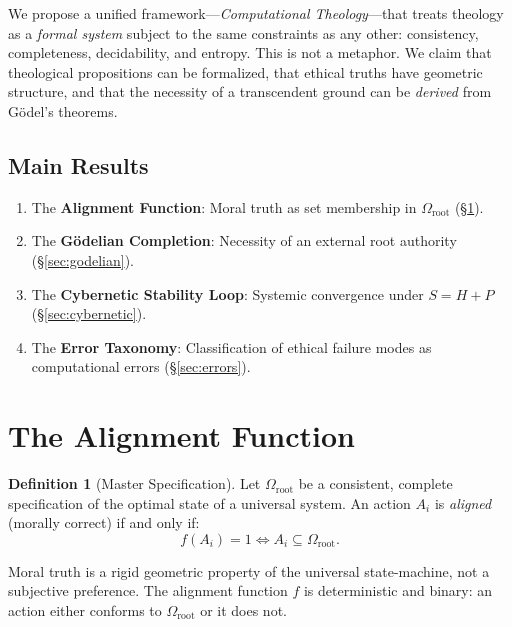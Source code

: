 \documentclass[12pt, a4paper]{article}
\theoremstyle{plain}
\theoremstyle{definition}
\newtheorem{definition}[theorem]{Definition}
\begin{document}
We propose a unified framework---\emph{Computational Theology}---that
treats theology as a \emph{formal system} subject to the same constraints
as any other: consistency, completeness, decidability, and entropy. This
is not a metaphor. We claim that theological propositions can be formalized,
that ethical truths have geometric structure, and that the necessity of a
transcendent ground can be \emph{derived} from G\"odel's theorems.

\subsection{Main Results}
\begin{enumerate}
  \item The \textbf{Alignment Function}: Moral truth as set membership
    in $\Omega_{\text{root}}$ (\S\ref{sec:alignment}).
  \item The \textbf{G\"odelian Completion}: Necessity of an external root
    authority (\S\ref{sec:godelian}).
  \item The \textbf{Cybernetic Stability Loop}: Systemic convergence under
    $S = H + P$ (\S\ref{sec:cybernetic}).
  \item The \textbf{Error Taxonomy}: Classification of ethical failure modes
    as computational errors (\S\ref{sec:errors}).
\end{enumerate}

\section{The Alignment Function}\label{sec:alignment}

\begin{definition}[Master Specification]\label{def:omega}
  Let $\Omega_{\text{root}}$ be a consistent, complete specification of the
  optimal state of a universal system. An action $A_i$ is \emph{aligned}
  (morally correct) if and only if:
  \begin{equation}\label{eq:alignment}
    f(A_i) = 1 \iff A_i \subseteq \Omega_{\text{root}}.
  \end{equation}
\end{definition}

\begin{axiom}\label{ax:geometric}
  Moral truth is a rigid geometric property of the universal state-machine,
  not a subjective preference. The alignment function $f$ is deterministic
  and binary: an action either conforms to $\Omega_{\text{root}}$ or it
  does not.
\end{axiom}
\end{document}
